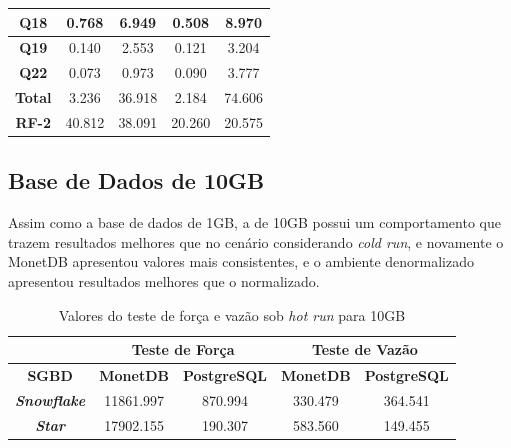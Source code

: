 \begin{table}[t]
\begin{tabular}{|c|c|c|c|c|}
        \textbf{Q18}   & 0.768             & 6.949               & 0.508            & 8.970               \\ \hline
        \textbf{Q19}   & 0.140             & 2.553               & 0.121            & 3.204               \\ \hline
        \textbf{Q22}   & 0.073             & 0.973               & 0.090            & 3.777               \\ \hline
        \textbf{Total} & 3.236             & 36.918              & 2.184            & 74.606              \\ \hline
        \textbf{RF-2}  & 40.812            & 38.091              & 20.260           & 20.575              \\ \hline
        \end{tabular}
        \end{table}



\subsection{Base de Dados de 10GB}

Assim como a base de dados de 1GB, a de 10GB possui um comportamento que trazem resultados melhores que no cenário considerando \textit{cold run}, e novamente o MonetDB apresentou valores mais consistentes, e o ambiente denormalizado apresentou resultados melhores que o normalizado.

\begin{table}[htpb]
        \centering
        \caption{Valores do teste de força e vazão sob \textit{hot run} para 10GB}
        \label{tab:forca_vazao_hot_10}
        \begin{tabular}{|c|c|c|c|c|}
        \hline
        & \multicolumn{2}{c|}{\textbf{Teste de Força}} & \multicolumn{2}{c|}{\textbf{Teste de Vazão}} \\ \hline
        \textbf{SGBD}               & \textbf{MonetDB}    & \textbf{PostgreSQL}    & \textbf{MonetDB}    & \textbf{PostgreSQL}    \\ \hline
        \textit{\textbf{Snowflake}} & 11861.997           & 870.994                & 330.479             & 364.541                \\ \hline
        \textit{\textbf{Star}}      & 17902.155           & 190.307                & 583.560             & 149.455                \\ \hline
        \end{tabular}
\end{table}

